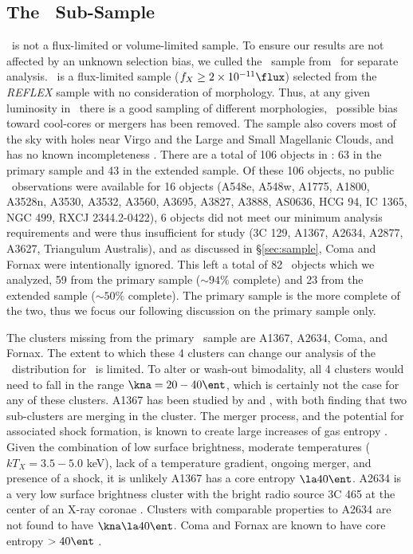 \documentclass{emulateapj}
\begin{document}
\subsection{The \hifl\ Sub-Sample}
\label{sec:hifl}

\accept\ is not a flux-limited or volume-limited sample. To ensure our
results are not affected by an unknown selection bias, we culled the
\hifl\ sample from \accept\ for separate analysis. \hifl\ is a
flux-limited sample ($f_X \ge 2 \times 10^{-11} \flux$) selected from
the {\it{REFLEX}} sample \citep{reflex} with no consideration of
morphology. Thus, at any given luminosity in \hifl\ there is a good
sampling of different morphologies, \ie\ possible bias toward
cool-cores or mergers has been removed. The sample also covers most of
the sky with holes near Virgo and the Large and Small Magellanic
Clouds, and has no known incompleteness
\citep{2007A&A...466..805C}. There are a total of 106 objects in
\hifl: 63 in the primary sample and 43 in the extended sample. Of
these 106 objects, no public \chandra\ observations were available for
16 objects (A548e, A548w, A1775, A1800, A3528n, A3530, A3532, A3560,
A3695, A3827, A3888, AS0636, HCG 94, IC 1365, NGC 499, RXCJ
2344.2-0422), 6 objects did not meet our minimum analysis requirements
and were thus insufficient for study (3C 129, A1367, A2634, A2877,
A3627, Triangulum Australis), and as discussed in \S\ref{sec:sample},
Coma and Fornax were intentionally ignored. This left a total of 82
\hifl\ objects which we analyzed, 59 from the primary sample ($\sim
94\%$ complete) and 23 from the extended sample ($\sim 50\%$
complete). The primary sample is the more complete of the two, thus we
focus our following discussion on the primary sample only.

The clusters missing from the primary \hifl\ sample are A1367, A2634,
Coma, and Fornax. The extent to which these 4 clusters can change our
analysis of the \kna\ distribution for \hifl\ is limited.  To alter or
wash-out bimodality, all 4 clusters would need to fall in the range
$\kna = 20-40 \ent$, which is certainly not the case for any of these
clusters. A1367 has been studied by \citet{1998ApJ...500..138D} and
\citet{2002ApJ...576..708S}, with both finding that two sub-clusters
are merging in the cluster. The merger process, and the potential for
associated shock formation, is known to create large increases of gas
entropy \citep{2007MNRAS.376..497M}. Given the combination of low
surface brightness, moderate temperatures ($kT_X = 3.5-5.0$ keV), lack
of a temperature gradient, ongoing merger, and presence of a shock, it
is unlikely A1367 has a core entropy $\la 40 \ent$. A2634 is a very
low surface brightness cluster with the bright radio source 3C 465 at
the center of an X-ray coronae \citep{coronae}. Clusters with
comparable properties to A2634 are not found to have $\kna \la 40
\ent$. Coma and Fornax are known to have core entropy $> 40 \ent$
\citep[][C. Scharf, private communication]{2008arXiv0802.1864R}.
\end{document}
